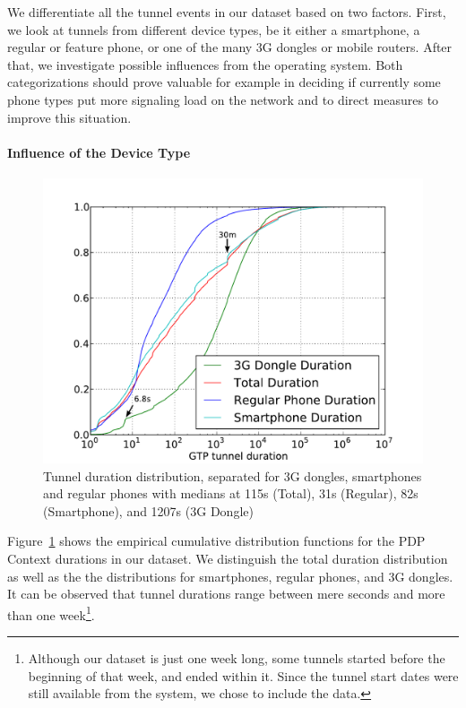 We differentiate all the tunnel events in our dataset based on two factors. First, we look at tunnels from different device types, be it either a smartphone, a regular or feature phone, or one of the many 3G dongles or mobile routers. After that, we investigate possible influences from the operating system. Both categorizations should prove valuable for example in deciding if currently some phone types put more signaling load on the network and to direct measures to improve this situation.



\paragraph{Influence of the Device Type}

\begin{figure}
	\centering
	\includegraphics[width=\columnwidth]{images/IMC2013/tunnel-dur-class-cdf-mod.pdf}
	\caption{Tunnel duration distribution, separated for 3G dongles, smartphones and regular phones with medians at 115s (Total), 31s (Regular), 82s (Smartphone), and 1207s (3G Dongle)}
	\label{fig:cdf-duration-device-class}
\end{figure}

Figure~\ref{fig:cdf-duration-device-class} shows the empirical cumulative distribution functions for the PDP Context durations in our dataset. We distinguish the total duration distribution as well as the the distributions for smartphones, regular phones, and 3G dongles. It can be observed that tunnel durations range between mere seconds and more than one week\footnote{Although our dataset is just one week long, some tunnels started before the beginning of that week, and ended within it. Since the tunnel start dates were still available from the system, we chose to include the data.}.

